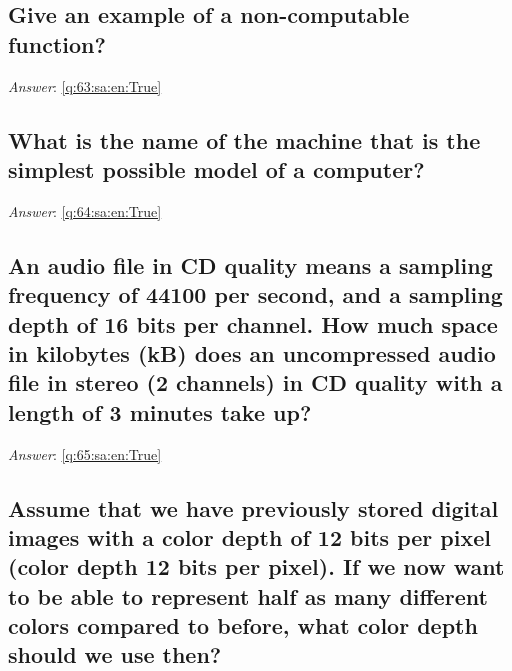 \documentclass[a4paper,11pt,oneside]{article}
\begin{document}
\begin{sloppypar}
\subsection{Give an example of a non-computable function?}

\label{q:63:sa:en:False}

\vspace{2cm}

\noindent\makebox[\textwidth]{\hrulefill}

\vspace{1cm}

\textit{Answer}: \autoref{q:63:sa:en:True}



\subsection{What is the name of the machine that is the simplest possible model of a computer?}

\label{q:64:sa:en:False}

\vspace{2cm}

\noindent\makebox[\textwidth]{\hrulefill}

\vspace{1cm}

\textit{Answer}: \autoref{q:64:sa:en:True}



\subsection{An audio file in CD quality means a sampling frequency of 44100 per second, and a sampling depth of 16 bits per channel. How much space in kilobytes (kB) does an uncompressed audio file in stereo (2 channels) in CD quality with a length of 3 minutes take up?}

\label{q:65:sa:en:False}

\vspace{2cm}

\noindent\makebox[\textwidth]{\hrulefill}

\vspace{1cm}

\textit{Answer}: \autoref{q:65:sa:en:True}



\subsection{Assume that we have previously stored digital images with a color depth of 12 bits per pixel (color depth 12 bits per pixel). If we now want to be able to represent half as many different colors compared to before, what color depth should we use then?}


\end{sloppypar}
\end{document}
